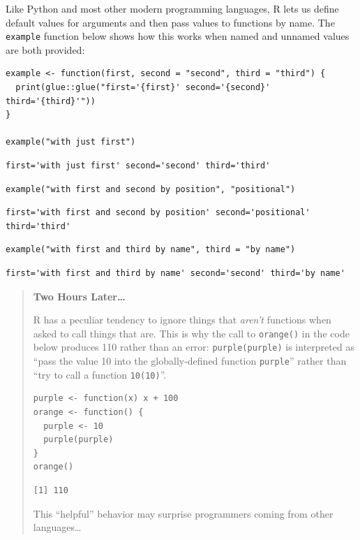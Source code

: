 Like Python and most other modern programming languages,
R lets us define default values for arguments
and then pass values to functions by name.
The \texttt{example} function below shows
how this works when named and unnamed values are both provided:

\begin{lstlisting}
example <- function(first, second = "second", third = "third") {
  print(glue::glue("first='{first}' second='{second}' third='{third}'"))
}

example("with just first")
\end{lstlisting}

\begin{lstlisting}
first='with just first' second='second' third='third'
\end{lstlisting}

\begin{lstlisting}
example("with first and second by position", "positional")
\end{lstlisting}

\begin{lstlisting}
first='with first and second by position' second='positional' third='third'
\end{lstlisting}

\begin{lstlisting}
example("with first and third by name", third = "by name")
\end{lstlisting}

\begin{lstlisting}
first='with first and third by name' second='second' third='by name'
\end{lstlisting}

\begin{quote}
\textbf{Two Hours Later{\ldots}}

R has a peculiar tendency to ignore things that \emph{aren't} functions
when asked to call things that are.
This is why the call to \texttt{orange()} in the code below
produces 110 rather than an error:
\texttt{purple(purple)} is interpreted as
``pass the value 10 into the globally-defined function \texttt{purple}''
rather than ``try to call a function \texttt{10(10)}''.

\begin{lstlisting}
purple <- function(x) x + 100
orange <- function() {
  purple <- 10
  purple(purple)
}
orange()
\end{lstlisting}

\begin{lstlisting}
[1] 110
\end{lstlisting}

\noindent
This ``helpful'' behavior may surprise programmers coming from other languages{\ldots}

\end{quote}

